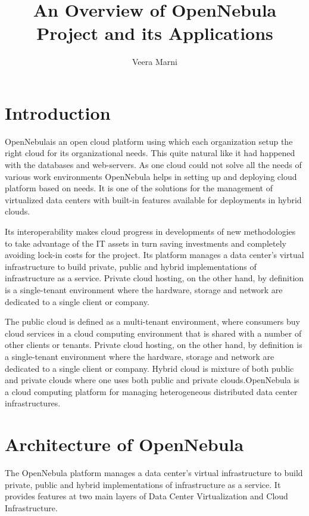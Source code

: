 \documentclass[9pt,twocolumn,twoside]{../../styles/osajnl}
\title{An Overview of OpenNebula Project and its Applications}
\author[1]{Veera Marni}
\affil[1]{School of Informatics and Computing, Bloomington, IN 47408, U.S.A.}
\affil[*]{Corresponding authors: vmarni@umail.iu.edu}
\begin{document}
\maketitle

\section{Introduction} 

{OpenNebula}\cite{www-wiki-opennebula}is an open cloud platform 
using which each organization setup the right cloud for its 
organizational needs. This quite natural like it had happened with the 
databases and web-servers. {As one cloud could not solve all the 
needs of various work environments OpenNebula helps in setting up and 
deploying cloud platform based on needs}\cite{www-about-opennebula}. 
It is one of the solutions for the management of virtualized data centers
with built-in features available for deployments in hybrid clouds.

Its interoperability makes cloud progress in developments of new 
methodologies to take advantage of the IT assets in turn saving 
investments and completely avoiding lock-in costs for the project. 
Its platform manages a data center's virtual infrastructure to build 
private, public and hybrid implementations of infrastructure as a 
service. Private cloud hosting, on the other hand, by definition is a single-tenant 
environment where the hardware, storage and network are dedicated to a 
single client or company. 

The public cloud is defined as a multi-tenant 
environment, where consumers buy cloud services in a cloud computing environment 
that is shared with a number of other clients or tenants. Private cloud hosting, 
on the other hand, by definition is a single-tenant environment where the 
hardware, storage and network are dedicated to a single client or company. Hybrid 
cloud is mixture of both public and private clouds where one uses both public 
and private clouds.OpenNebula is a cloud computing platform for managing heterogeneous
distributed data center infrastructures.

\section{Architecture of OpenNebula}

The OpenNebula platform manages a data center's virtual infrastructure 
to build private, public and hybrid implementations of infrastructure as 
a service. It provides features at two main layers of Data Center 
Virtualization and Cloud Infrastructure.
\end{document}
